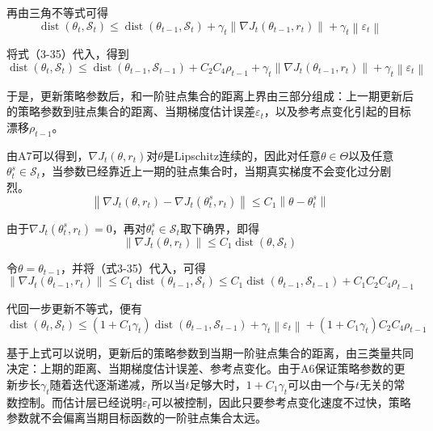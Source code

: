 \documentclass{sufethesismas}
\begin{document}
再由三角不等式可得
\begin{equation}
\operatorname{dist}(\theta_t,\mathcal S_t)
\le
\operatorname{dist}(\theta_{t-1},\mathcal S_t)
+
\gamma_t
\left\|
\nabla J_t(\theta_{t-1},r_t)
\right\|
+
\gamma_t
\left\|
\varepsilon_t
\right\|
\end{equation}

将式（3-35）代入，得到
\begin{equation}
\operatorname{dist}(\theta_t,\mathcal S_t)
\le
\operatorname{dist}(\theta_{t-1},\mathcal S_{t-1})
+
C_2 C_4 \rho_{t-1}
+
\gamma_t
\left\|
\nabla J_t(\theta_{t-1},r_t)
\right\|
+
\gamma_t
\left\|
\varepsilon_t
\right\|
\end{equation}

于是，更新策略参数后，和一阶驻点集合的距离上界由三部分组成：上一期更新后的策略参数到驻点集合的距离、当期梯度估计误差$\varepsilon_t$，以及参考点变化引起的目标漂移$\rho_{t-1}$。

由A7可以得到，$\nabla J_t(\theta,r_t)$对$\theta$是Lipschitz连续的，因此对任意$\theta \in \Theta$以及任意$\theta^s_t \in \mathcal S_t$，当参数已经靠近上一期的驻点集合时，当期真实梯度不会变化过分剧烈。
\begin{equation}
\left\|
\nabla J_t(\theta,r_t)-\nabla J_t(\theta^s_t,r_t)
\right\|
\le
C_1
\left\|
\theta-\theta^s_t
\right\|
\end{equation}

由于$\nabla J_t(\theta^s_t,r_t)=0$，再对$\theta^s_t \in \mathcal S_t$取下确界，即得
\begin{equation}
\left\|
\nabla J_t(\theta,r_t)
\right\|
\le
C_1
\operatorname{dist}(\theta,\mathcal S_t)
\end{equation}

令$\theta=\theta_{t-1}$，并将（式3-35）代入，可得
\begin{equation}
\left\|
\nabla J_t(\theta_{t-1},r_t)
\right\|
\le
C_1
\operatorname{dist}(\theta_{t-1},\mathcal S_t)
\le
C_1
\operatorname{dist}(\theta_{t-1},\mathcal S_{t-1})
+
C_1 C_2 C_4 \rho_{t-1}
\end{equation}

代回一步更新不等式，便有
\begin{equation}
\operatorname{dist}(\theta_t,\mathcal S_t)
\le
\left(1+C_1 \gamma_t\right)
\operatorname{dist}(\theta_{t-1},\mathcal S_{t-1})
+
\gamma_t
\left\|
\varepsilon_t
\right\|
+
\left(1+C_1 \gamma_t\right) C_2 C_4 \rho_{t-1}
\end{equation}

基于上式可以说明，更新后的策略参数到当期一阶驻点集合的距离，由三类量共同决定：上期的距离、当期梯度估计误差、参考点变化。由于A6保证策略参数的更新步长$\gamma_t$随着迭代逐渐递减，所以当$t$足够大时，$1+C_1\gamma_t$可以由一个与$t$无关的常数控制。而估计层已经说明$\varepsilon_t$可以被控制，因此只要参考点变化速度不过快，策略参数就不会偏离当期目标函数的一阶驻点集合太远。
\end{document}
